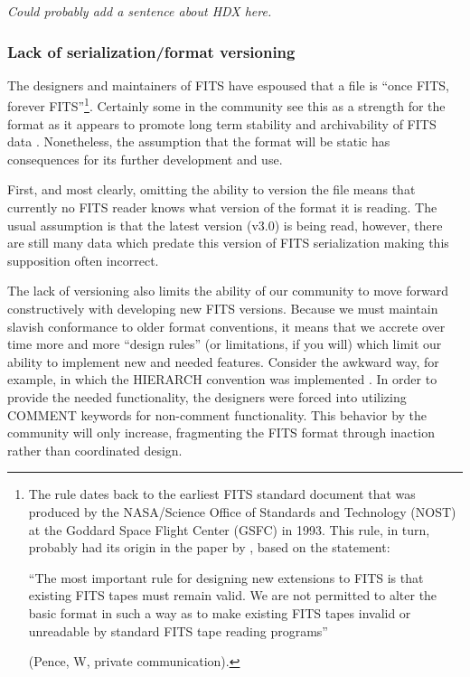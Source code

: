 \documentclass[final,authoryear,5p,times,twocolumn]{elsarticle}
\begin{document}
\textit{\color{red} Could probably add a sentence about HDX here.}

\subsubsection{Lack of serialization/format versioning}


The designers and maintainers of FITS have espoused that a file is
``once FITS, forever FITS''\footnote{The rule dates back to the earliest
FITS standard document that was produced by the NASA/Science Office
of Standards and Technology (NOST) at the Goddard Space Flight Center
(GSFC) in 1993. This rule, in turn, probably had its origin in the paper
by \citet{1988A&AS...73..359G}, based on the statement:

``The most important rule for designing new extensions to FITS is that
existing FITS tapes must remain valid.  We are not permitted to alter
the basic format in such a way as to make existing FITS tapes invalid
or unreadable by standard FITS tape reading programs''

(Pence, W, private communication).}.
Certainly some in the community see
this as a strength for the format as it appears to promote long term
stability and archivability of FITS data \citep[][US Library of
Congress\footnote{see
\url{http://www.digitalpreservation.gov/formats/fdd/fdd000317.shtml}}]{2012EWASSAlle}.
Nonetheless, the assumption that the format will be static has consequences
for its further development and use.


First, and most clearly, omitting the ability to version the file
means that currently no FITS reader knows what version of the format
it is reading. The usual assumption is that the latest version (v3.0)
is being read, however, there are still many data which predate this
version of FITS serialization making this supposition often incorrect.


The lack of versioning also limits the ability of our community to
move forward constructively with developing new FITS versions. Because
we must maintain slavish conformance to older format conventions, it
means that we accrete over time more and more ``design rules'' (or
limitations, if you will) which limit our ability to implement new and
needed features. Consider the awkward way, for example, in which the
HIERARCH convention was implemented \citep{2009Wic}.
In order to provide the needed functionality, the designers
were forced into utilizing COMMENT keywords for non-comment
functionality. This behavior by the community will only increase,
fragmenting the FITS format through inaction rather than coordinated
design.
\end{document}
